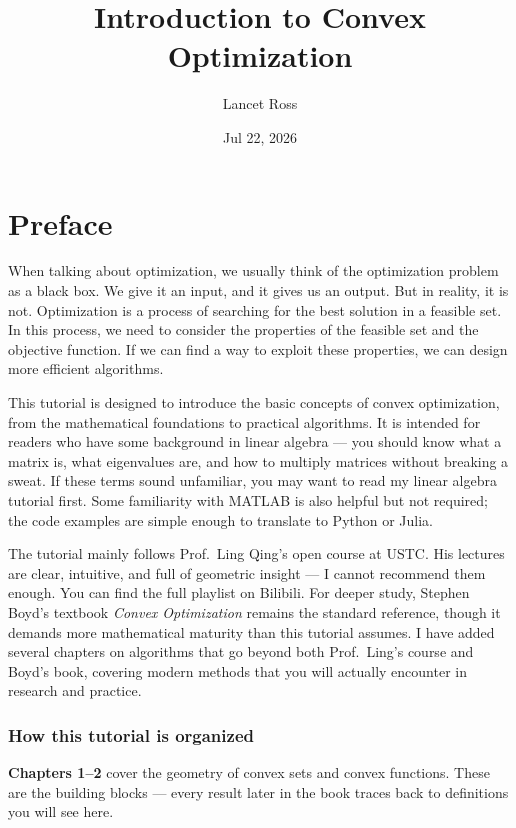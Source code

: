 \documentclass[lang=en,color=blue,mode=fancy,titlestyle=hang]{elegantbook}
\title{Introduction to Convex Optimization}
\author{Lancet Ross}
\date{Jul 22, 2026}
\begin{document}
\maketitle

\frontmatter
\tableofcontents

\chapter*{Preface}

When talking about optimization, we usually think of the optimization problem as a black box.
We give it an input, and it gives us an output. But in reality, it is not. Optimization is a
process of searching for the best solution in a feasible set. In this process, we need to
consider the properties of the feasible set and the objective function. If we can find a way to
exploit these properties, we can design more efficient algorithms.

This tutorial is designed to introduce the basic concepts of convex optimization, from the
mathematical foundations to practical algorithms. It is intended for readers who have some
background in linear algebra — you should know what a matrix is, what eigenvalues are, and
how to multiply matrices without breaking a sweat. If these terms sound unfamiliar, you may
want to read my linear algebra tutorial first. Some familiarity with MATLAB is also helpful
but not required; the code examples are simple enough to translate to Python or Julia.

The tutorial mainly follows Prof.\ Ling Qing's open course at USTC. His lectures are clear,
intuitive, and full of geometric insight — I cannot recommend them enough. You can find the full
playlist on Bilibili. For deeper study, Stephen Boyd's textbook \textit{Convex Optimization}
remains the standard reference, though it demands more mathematical maturity than this tutorial
assumes. I have added several chapters on algorithms that go beyond both Prof.\ Ling's course
and Boyd's book, covering modern methods that you will actually encounter in research and practice.

\subsection*{How this tutorial is organized}

\textbf{Chapters 1–2} cover the geometry of convex sets and convex functions. These are the
building blocks — every result later in the book traces back to definitions you will see here.
\end{document}
